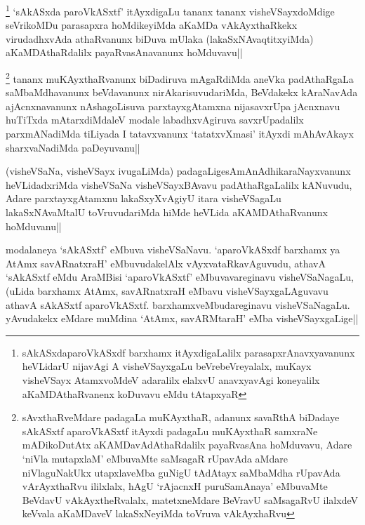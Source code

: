 
\begin{artha}
\footnote[4]{sAkASxdaparoVkASxdf barxhamx itAyxdigaLalilx parasapxrAnavxyavanunx heVLidarU nijavAgi A visheVSayxgaLu beVrebeVreyalalx, muKayx visheVSayx AtamxvoMdeV adaralilx elalxvU anavxyavAgi koneyalilx aKaMDAthaRvanenx koDuvavu eMdu tAtapxyaR} `sAkASxda paroVkASxtf' itAyxdigaLu tananx tananx visheVSayxdoMdige seVrikoMDu parasapxra hoMdikeyiMda aKaMDa vAkAyxthaRkekx virudadhxvAda athaRvanunx biDuva mUlaka (lakaSxNAvaqtitxyiMda) aKaMDAthaRdalilx payaRvasAnavanunx hoMduvavu||
\end{artha}


\begin{artha}
\footnote[1]{sAvxthaRveMdare padagaLa muKAyxthaR, adanunx savaRthA biDadaye sAkASxtf aparoVkASxtf itAyxdi padagaLu muKAyxthaR samxraNe mADikoDutAtx aKAMDavAdAthaRdalilx payaRvasAna hoMduvavu, Adare `niVla mutapxlaM' eMbuvaMte saMsagaR rUpavAda aMdare niVlaguNakUkx utapxlaveMba guNigU tAdAtayx saMbaMdha rUpavAda vArAyxthaRvu ililxlalx, hAgU `rAjacnxH puruSamAnaya' eMbuvaMte BeVdavU vAkAyxtheRvalalx, matetxneMdare BeVravU saMsagaRvU ilalxdeV keVvala aKaMDaveV lakaSxNeyiMda toVruva vAkAyxhaRvu} tananx muKAyxthaRvanunx biDadiruva mAgaRdiMda aneVka padAthaRgaLa saMbaMdhavanunx beVdavanunx nirAkarisuvudariMda, BeVdakekx kAraNavAda ajAcnxnavanunx nAshagoLisuva parxtayxgAtamxna nijasavxrUpa jAcnxnavu huTiTxda mAtarxdiMdaleV modale labadhxvAgiruva savxrUpadalilx parxmANadiMda tiLiyada I tatavxvanunx `tatatxvXmasi' itAyxdi mAhAvAkayx sharxvaNadiMda paDeyuvanu||
\end{artha}


\begin{artha}
(visheVSaNa, visheVSayx ivugaLiMda) padagaLige\footnotemark[1]sAmAnAdhikaraNayxvanunx heVLidadxriMda visheVSaNa visheVSayxBAvavu padAthaRgaLalilx kANuvudu, Adare parxtayxgAtamxnu lakaSxyXvAgiyU itara visheVSagaLu lakaSxNAvaMtalU toVruvudariMda hiMde heVLida aKAMDAthaRvanunx hoMduvanu||
\end{artha}


\begin{artha}
modalaneya `sAkASxtf' eMbuva visheVSaNavu. `aparoVkASxdf barxhamx ya AtAmx savARnatxraH' eMbuvudakelAlx vAyxvataRkavAguvudu, athavA `sAkASxtf eMdu AraMBisi `aparoVkASxtf' eMbuvavareginavu visheVSaNagaLu, (uLida barxhamx AtAmx, savARnatxraH eMbavu visheVSayxgaLAguvavu athavA sAkASxtf aparoVkASxtf. barxhamxveMbudareginavu visheVSaNagaLu. yAvudakekx eMdare muMdina `AtAmx, savARMtaraH' eMba visheVSayxgaLige||
\end{artha}

